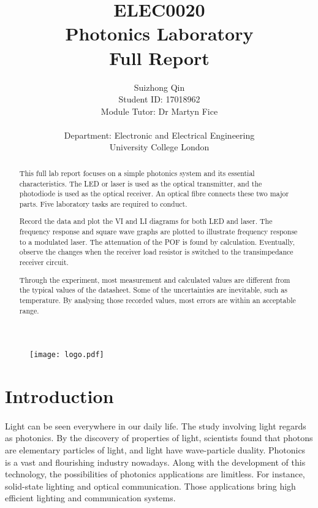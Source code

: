 \documentclass[12pt]{article}
\title{ELEC0020 \\ Photonics Laboratory\\Full Report}
\author{Suizhong Qin \\Student ID: 17018962 \\Module Tutor: Dr Martyn Fice \\\\ Department: Electronic and Electrical Engineering \\ University College London}
\begin{document}
    \begin{figure}[t] %
    \centering
    \texttt{[image: logo.pdf]}
    \end{figure}
    \maketitle
    \thispagestyle{empty}
    
    \newpage
    \begin{abstract}

    This full lab report focuses on a simple photonics system and its essential characteristics. The LED or laser is used as the optical transmitter, and the photodiode is used as the optical receiver. An optical fibre connects these two major parts. Five laboratory tasks are required to conduct.

    Record the data and plot the VI and LI diagrams for both LED and laser. The frequency response and square wave graphs are plotted to illustrate frequency response to a modulated laser. The attenuation of the POF is found by calculation. Eventually, observe the changes when the receiver load resistor is switched to the transimpedance receiver circuit. 
    
    Through the experiment, most measurement and calculated values are different from the typical values of the datasheet. Some of the uncertainties are inevitable, such as temperature. By analysing those recorded values, most errors are within an acceptable range. 
    \end{abstract}
    \thispagestyle{empty}
    
    \newpage
    \tableofcontents
    \thispagestyle{empty}
    \setcounter{page}{0}
    
    \newpage
    \pagestyle{plain}
    \section{Introduction}
    \paragraph{}
    Light can be seen everywhere in our daily life. The study involving light regards as photonics. By the discovery of properties of light, scientists found that photons are elementary particles of light, and light have wave-particle duality. Photonics is a vast and flourishing industry nowadays. Along with the development of this technology, the possibilities of photonics applications are limitless. For instance, solid-state lighting and optical communication\cite{1}. Those applications bring high efficient lighting and communication systems.
    
\end{document}

